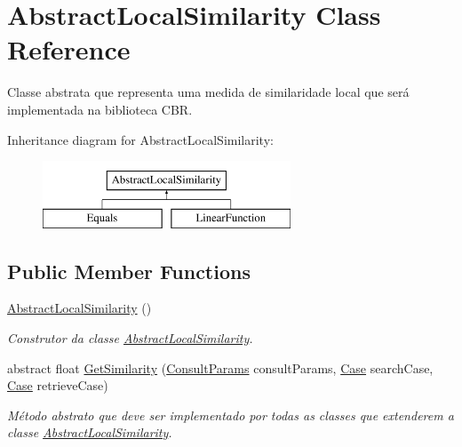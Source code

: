 \hypertarget{class_abstract_local_similarity}{}\section{Abstract\+Local\+Similarity Class Reference}
\label{class_abstract_local_similarity}


Classe abstrata que representa uma medida de similaridade local que será implementada na biblioteca C\+BR.  


Inheritance diagram for Abstract\+Local\+Similarity\+:\begin{figure}[H]
\begin{center}
\leavevmode
\includegraphics[height=2.000000cm]{class_abstract_local_similarity}
\end{center}
\end{figure}
\subsection*{Public Member Functions}
\begin{DoxyCompactItemize}
\item 
\hyperlink{class_abstract_local_similarity_a211b136bd5cd1525f3e4637868252696}{Abstract\+Local\+Similarity} ()
\begin{DoxyCompactList}\small\item\em Construtor da classe \hyperlink{class_abstract_local_similarity}{Abstract\+Local\+Similarity}. \end{DoxyCompactList}\item 
abstract float \hyperlink{class_abstract_local_similarity_a6c51b1fe09e99d509da0d3634225ca36}{Get\+Similarity} (\hyperlink{class_consult_params}{Consult\+Params} consult\+Params, \hyperlink{class_case}{Case} search\+Case, \hyperlink{class_case}{Case} retrieve\+Case)
\begin{DoxyCompactList}\small\item\em Método abstrato que deve ser implementado por todas as classes que extenderem a classe \hyperlink{class_abstract_local_similarity}{Abstract\+Local\+Similarity}. \end{DoxyCompactList}\end{DoxyCompactItemize}


